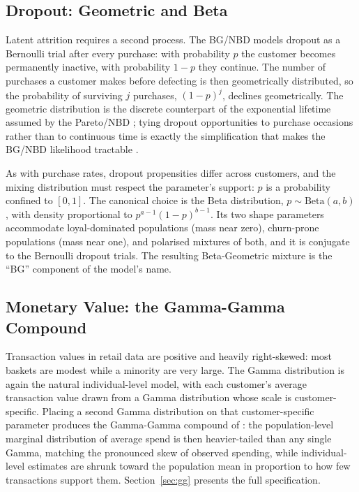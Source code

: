 \documentclass[12pt, a4paper, oneside]{report}
\begin{document}
\subsection{Dropout: Geometric and Beta}
\label{sec:dist-dropout}

Latent attrition requires a second process. The BG/NBD models dropout as a Bernoulli trial after every purchase: with probability $p$ the customer becomes permanently inactive, with probability $1-p$ they continue. The number of purchases a customer makes before defecting is then geometrically distributed, so the probability of surviving $j$ purchases, $(1-p)^j$, declines geometrically. The geometric distribution is the discrete counterpart of the exponential lifetime assumed by the Pareto/NBD \parencite{schmittlein1987}; tying dropout opportunities to purchase occasions rather than to continuous time is exactly the simplification that makes the BG/NBD likelihood tractable \parencite{fader2005}.

As with purchase rates, dropout propensities differ across customers, and the mixing distribution must respect the parameter's support: $p$ is a probability confined to $[0, 1]$. The canonical choice is the Beta distribution, $p \sim \text{Beta}(a, b)$, with density proportional to $p^{a-1}(1-p)^{b-1}$. Its two shape parameters accommodate loyal-dominated populations (mass near zero), churn-prone populations (mass near one), and polarised mixtures of both, and it is conjugate to the Bernoulli dropout trials. The resulting Beta-Geometric mixture is the ``BG'' component of the model's name.

\subsection{Monetary Value: the Gamma-Gamma Compound}
\label{sec:dist-spend}

Transaction values in retail data are positive and heavily right-skewed: most baskets are modest while a minority are very large. The Gamma distribution is again the natural individual-level model, with each customer's average transaction value drawn from a Gamma distribution whose scale is customer-specific. Placing a second Gamma distribution on that customer-specific parameter produces the Gamma-Gamma compound of \textcite{fader2013}: the population-level marginal distribution of average spend is then heavier-tailed than any single Gamma, matching the pronounced skew of observed spending, while individual-level estimates are shrunk toward the population mean in proportion to how few transactions support them. Section~\ref{sec:gg} presents the full specification.
\end{document}
